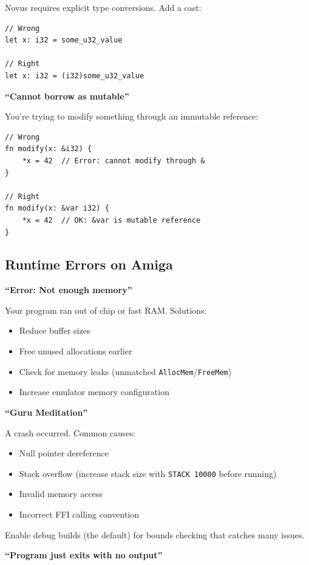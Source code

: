 Novus requires explicit type conversions. Add a cast:

\begin{lstlisting}
// Wrong
let x: i32 = some_u32_value

// Right
let x: i32 = (i32)some_u32_value
\end{lstlisting}

\textbf{``Cannot borrow as mutable''}

You're trying to modify something through an immutable reference:

\begin{lstlisting}
// Wrong
fn modify(x: &i32) {
    *x = 42  // Error: cannot modify through &
}

// Right
fn modify(x: &var i32) {
    *x = 42  // OK: &var is mutable reference
}
\end{lstlisting}

\subsection{Runtime Errors on Amiga}

\textbf{``Error: Not enough memory''}

Your program ran out of chip or fast RAM. Solutions:
\begin{itemize}
    \item Reduce buffer sizes
    \item Free unused allocations earlier
    \item Check for memory leaks (unmatched \texttt{AllocMem}/\texttt{FreeMem})
    \item Increase emulator memory configuration
\end{itemize}

\textbf{``Guru Meditation''}

A crash occurred. Common causes:
\begin{itemize}
    \item Null pointer dereference
    \item Stack overflow (increase stack size with \texttt{STACK 10000} before running)
    \item Invalid memory access
    \item Incorrect FFI calling convention
\end{itemize}

Enable debug builds (the default) for bounds checking that catches many issues.

\textbf{``Program just exits with no output''}

